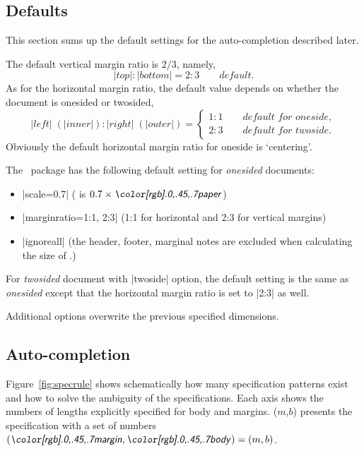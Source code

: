  \subsection{Defaults}\label{sec:defaults}

 This section sums up the default settings for the auto-completion
 described later.
 
 The default vertical margin ratio is $2/3$, namely,
 \begin{equation}
  |top| : |bottom| = 2 : 3 \qquad\textit{default}.
 \end{equation}
 As for the horizontal margin ratio, the default value depends on
 whether the document is onesided or twosided,
 \begin{equation}
  |left|\;(|inner|) : |right|\;(|outer|) 
       = \left\{ \begin{array}{ll}
              1 : 1 \qquad\textit{default for oneside},\\
              2 : 3 \qquad\textit{default for twoside}.
         \end{array}\right.
 \end{equation}
 Obviously the default horizontal margin ratio for oneside is `centering'.

 The \Gm\ package has the following default setting for
 \textit{onesided} documents:
 \begin{itemize}\setlength{\itemsep}{-.5\parsep}
  \item |scale=0.7| ( is $0.7 \times \gpart{paper}$)
  \item |marginratio={1:1, 2:3}| (1:1 for horizontal and 2:3 for vertical margins)
  \item |ignoreall| (the header, footer, marginal notes are excluded
  when calculating the size of .)
\end{itemize}
 For \textit{twosided} document with |twoside| option, the default
 setting is the same as \textit{onesided} except that the horizontal
 margin ratio is set to |2:3| as well.

 Additional options overwrite the previous specified dimensions. 

 \subsection{Auto-completion} \label{sec:rules}

 Figure~\ref{fig:specrule} shows schematically how many specification
 patterns exist and how to solve the ambiguity of the
 specifications. Each axis shows the numbers of lengths
 explicitly specified for body and margins. \Ss($m$,$b$) presents the
 specification with a set of numbers $(\gpart{margin},\gpart{body})=(m,b)$.

